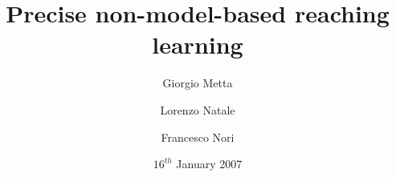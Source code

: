 \title {Precise non-model-based reaching learning}
\author{Giorgio Metta}
\author{Lorenzo Natale}
\author{Francesco Nori}
\date{$16^{th}$ January 2007}
\maketitle